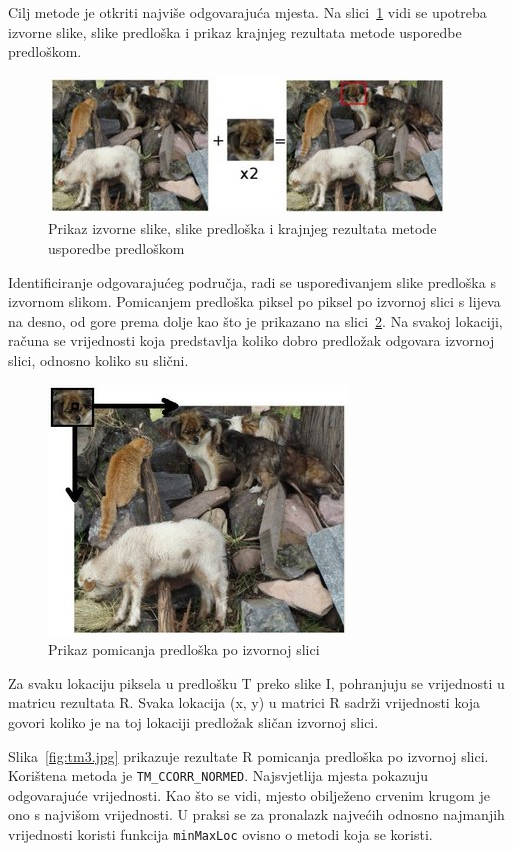 Cilj metode je otkriti najviše odgovarajuća mjesta. Na
slici~\ref{fig:tm1.jpg} vidi se upotreba izvorne slike, slike predloška
i prikaz krajnjeg rezultata metode usporedbe predloškom.

\begin{figure}[h]
\centering
\includegraphics[scale=1]{figures/tm1.jpg}
\caption{Prikaz izvorne slike, slike predloška i krajnjeg rezultata
metode usporedbe predloškom}
\label{fig:tm1.jpg}
\end{figure}

Identificiranje odgovarajućeg područja, radi se uspoređivanjem slike
predloška s izvornom slikom. Pomicanjem predloška piksel po piksel po
izvornoj slici s lijeva na desno, od gore prema dolje kao što je
prikazano na slici~\ref{fig:tm2.jpg}. Na svakoj lokaciji, računa se
vrijednosti koja predstavlja koliko dobro predložak odgovara izvornoj
slici, odnosno koliko su slični.

\begin{figure}[h]
\centering
\includegraphics[scale=0.5]{figures/tm2.jpg}
\caption{Prikaz pomicanja predloška po izvornoj slici}
\label{fig:tm2.jpg}
\end{figure}

Za svaku lokaciju piksela u predlošku T preko slike I, pohranjuju se
vrijednosti u matricu rezultata R. Svaka lokacija (x, y) u matrici R
sadrži vrijednosti koja govori koliko je na toj lokaciji predložak
sličan izvornoj slici. 

Slika~\ref{fig:tm3.jpg} prikazuje rezultate R pomicanja predloška po
izvornoj slici. Korištena metoda je \texttt{TM\_CCORR\_NORMED}.
Najsvjetlija mjesta pokazuju odgovarajuće vrijednosti. Kao što se vidi,
mjesto obilježeno crvenim krugom je ono s najvišom vrijednosti. U praksi
se za pronalazk najvećih odnosno najmanjih vrijednosti koristi funkcija
\texttt{minMaxLoc} ovisno o metodi koja se koristi.


